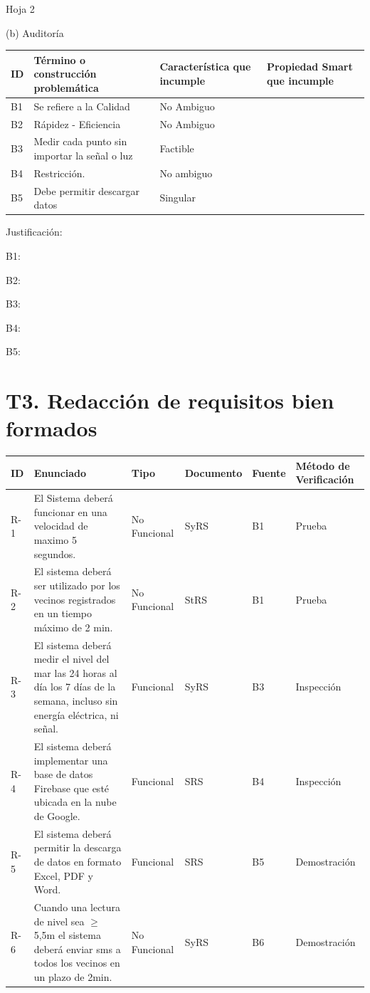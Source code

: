 \documentclass[11pt,a4paper]{article}
\begin{document}
\hfill Hoja 2

\newpage

(b) Auditoría

\begin{longtable}{|p{1cm}|p{5cm}|p{3.5cm}|p{4.5cm}|}
\hline
\textbf{ID} & \textbf{Término o construcción problemática} & \textbf{Característica que incumple} & \textbf{Propiedad Smart que incumple}\\
\hline
\endhead
B1 & Se refiere a la Calidad & No Ambiguo & \\
\hline
B2 & Rápidez - Eficiencia & No Ambiguo & \\
\hline
B3 & Medir cada punto sin importar la señal o luz & Factible & \\
\hline
B4 & Restricción. & No ambiguo & \\
\hline
B5 & Debe permitir descargar datos & Singular & \\
\hline
\end{longtable}

Justificación:

B1:

B2:

B3:

B4:

B5:

\section*{T3. Redacción de requisitos bien formados}

\begin{longtable}{|p{1cm}|p{5.2cm}|p{1.9cm}|p{1.5cm}|p{1.2cm}|p{2.4cm}|}
\hline
\textbf{ID} & \textbf{Enunciado} & \textbf{Tipo} & \textbf{Documento} & \textbf{Fuente} & \textbf{Método de Verificación}\\
\hline
\endhead
R-1 & El Sistema deberá funcionar en una velocidad de maximo 5 segundos. & No Funcional & SyRS & B1 & Prueba\\
\hline
R-2 & El sistema deberá ser utilizado por los vecinos registrados en un tiempo máximo de 2 min. & No Funcional & StRS & B1 & Prueba\\
\hline
R-3 & El sistema deberá medir el nivel del mar las 24 horas al día los 7 días de la semana, incluso sin energía eléctrica, ni señal. & Funcional & SyRS & B3 & Inspección\\
\hline
R-4 & El sistema deberá implementar una base de datos Firebase que esté ubicada en la nube de Google. & Funcional & SRS & B4 & Inspección\\
\hline
R-5 & El sistema deberá permitir la descarga de datos en formato Excel, PDF y Word. & Funcional & SRS & B5 & Demostración\\
\hline
R-6 & Cuando una lectura de nivel sea $\geq$ 5,5m el sistema deberá enviar sms a todos los vecinos en un plazo de 2min. & No Funcional & SyRS & B6 & Demostración\\
\hline
\end{longtable}
\end{document}
